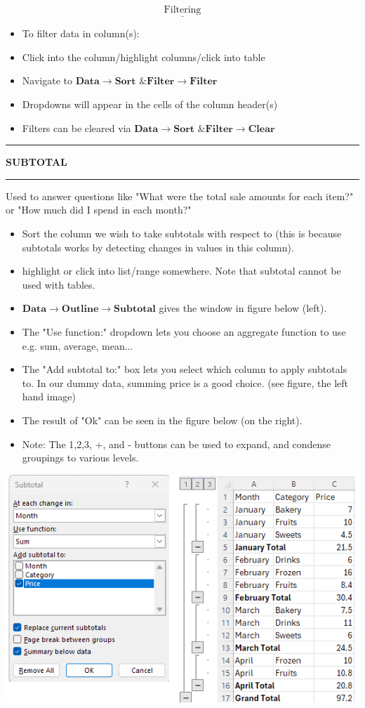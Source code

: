\documentclass[8pt]{extarticle}
\newcommand{\heading}[1]{%
    \noindent
    \rule{\linewidth}{0.4pt}
    \begin{center}
        \vspace{-1ex}
        \textbf{#1}        
        \vspace{-2.5ex}
    \end{center}
    \rule{\linewidth}{0.4pt}
}
\begin{document}
\begin{multicols}{3}
\[\underline{\text{Filtering}}\]

\begin{itemize}
    \item To filter data in column(s): 
    \item Click into the column/highlight columns/click into table
    \item Navigate to \( \textbf{Data} \rightarrow \textbf{Sort \& Filter} \rightarrow \textbf{Filter}\)
    \item Dropdowns will appear in the cells of the column header(s)
    \item Filters can be cleared via \( \textbf{Data} \rightarrow \textbf{Sort \& Filter} \rightarrow \textbf{Clear}\)
\end{itemize}

\heading{SUBTOTAL}

Used to answer questions like "What were the total sale amounts for each item?" or "How much did I spend in each month?"

\begin{itemize}
    \item Sort the column we wish to take subtotals with respect to (this is because subtotals works by detecting changes in values in this column).
    \item highlight or click into list/range somewhere. Note that subtotal cannot be used with tables.
    \item $ \textbf{Data} \rightarrow \textbf{Outline} \rightarrow \textbf{Subtotal}$ gives the window in figure below (left).
    \item The "Use function:" dropdown lets you choose an aggregate function to use e.g. sum, average, mean...
    \item The "Add subtotal to:" box lets you select which column to apply subtotals to. In our dummy data, summing price is a good choice. (see figure, the left hand image)
    \item The result of "Ok" can be seen in the figure below (on the right). 
    \item Note: The 1,2,3, +, and - buttons can be used to expand, and condense groupings to various levels. 
\end{itemize}      
    \begin{center}
    \includegraphics[width = 0.95\columnwidth]{images/subtotal.png}
    \end{center}


\end{multicols}
\end{document}
